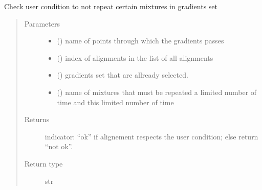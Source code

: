 \documentclass[letterpaper,10pt,english]{sphinxmanual}
\begin{document}
\label{\detokenize{ExperimentsPlannification:module-modules}}

\begin{fulllineitems}
\label{\detokenize{ExperimentsPlannification:modules.check_repeat_only}}
\sphinxAtStartPar
Check user condition to not repeat certain mixtures in gradients set
\begin{quote}\begin{description}
\item[{Parameters}] \leavevmode\begin{itemize}
\item {} 
\sphinxAtStartPar
{} () \textendash{} name of points through which the gradients passes

\item {} 
\sphinxAtStartPar
{} () \textendash{} index of alignments in the list of all alignments

\item {} 
\sphinxAtStartPar
{} () \textendash{} gradients set that are allready selected.

\item {} 
\sphinxAtStartPar
{} () \textendash{} name of mixtures that must be repeated a limited number of time and this limited number of time

\end{itemize}

\item[{Returns}] \leavevmode
\sphinxAtStartPar
indicator: “ok” if alignement respects the user condition; else return “not ok”.

\item[{Return type}] \leavevmode
\sphinxAtStartPar
str

\end{description}\end{quote}

\end{fulllineitems}
\end{document}
